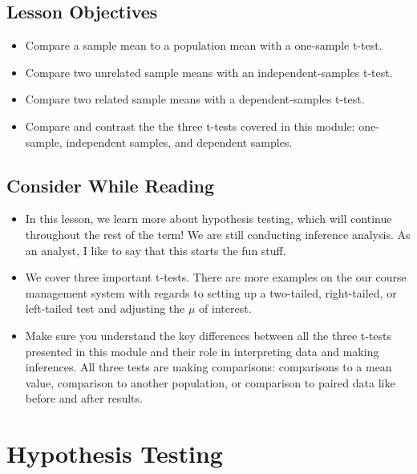 \documentclass[
  letterpaper,
  DIV=11,
  numbers=noendperiod]{scrreprt}
\providecommand{\tightlist}{%
  \setlength{\itemsep}{0pt}\setlength{\parskip}{0pt}}\usepackage{longtable,booktabs,array}
\begin{document}
\section{Lesson Objectives}\label{lesson-objectives-6}

\begin{itemize}
\tightlist
\item
  Compare a sample mean to a population mean with a one-sample t-test.
\item
  Compare two unrelated sample means with an independent-samples t-test.
\item
  Compare two related sample means with a dependent-samples t-test.
\item
  Compare and contrast the the three t-tests covered in this module:
  one-sample, independent samples, and dependent samples.
\end{itemize}

\section{Consider While Reading}\label{consider-while-reading-6}

\begin{itemize}
\tightlist
\item
  In this lesson, we learn more about hypothesis testing, which will
  continue throughout the rest of the term! We are still conducting
  inference analysis. As an analyst, I like to say that this starts the
  fun stuff.
\item
  We cover three important t-tests. There are more examples on the our
  course management system with regards to setting up a two-tailed,
  right-tailed, or left-tailed test and adjusting the \(\mu\) of
  interest.
\item
  Make sure you understand the key differences between all the three
  t-tests presented in this module and their role in interpreting data
  and making inferences. All three tests are making comparisons:
  comparisons to a mean value, comparison to another population, or
  comparison to paired data like before and after results.
\end{itemize}


\chapter{Hypothesis Testing}\label{hypothesis-testing}
\end{document}
